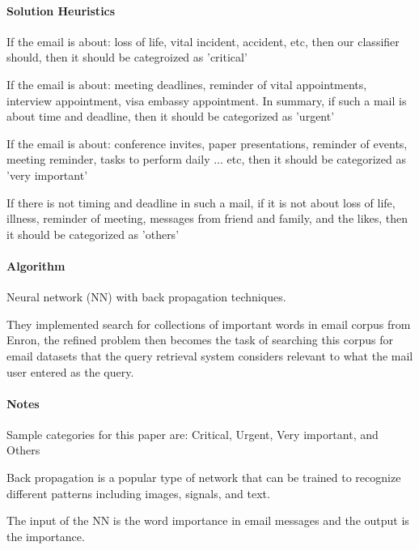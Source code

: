 \documentclass[12pt]{article}
\newenvironment{my_itemize}
{\begin{itemize}
  \setlength{\itemsep}{0cm}
  \setlength{\parskip}{0cm}}
{\end{itemize}}
\begin{document}
\paragraph{Solution Heuristics}
\begin{my_itemize}
 \item If the email is about: loss of life, vital incident, accident, etc, then our classifier should, then it should be categroized as 'critical'
 \item If the email is about: meeting deadlines, reminder of vital appointments, interview appointment, visa embassy appointment. In summary, if such a mail is about time and deadline, then it should be categorized as 'urgent'
 \item If the email is about: conference invites, paper presentations, reminder of events, meeting reminder, tasks to perform daily ... etc, then it should be categorized as 'very important'
 \item If there is not timing and deadline in such a mail, if it is not about loss of life, illness, reminder of meeting, messages from friend and family, and the likes, then it should be categorized as 'others'
\end{my_itemize}

\paragraph{Algorithm}
\begin{my_itemize}
 \item Neural network (NN) with back propagation techniques. 
 \item They implemented search for collections of important words in email corpus from Enron, the refined problem then becomes the task of searching this corpus for email datasets that the query retrieval system considers relevant to what the mail user entered as the query.
\end{my_itemize}

\paragraph{Notes}
\begin{my_itemize}
 \item Sample categories for this paper are: Critical, Urgent, Very important, and Others
 \item Back propagation is a popular type of network that can be trained to recognize different patterns including images, signals, and text. 
 \item The input of the NN is the word importance in email messages and the output is the importance.
\end{my_itemize}
\end{document}

